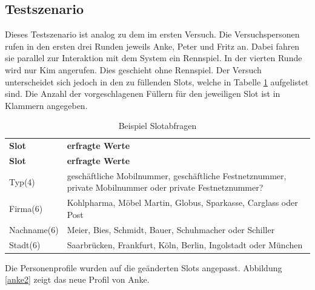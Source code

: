 \documentclass[12pt,a4paper]{scrartcl}
\begin{document}
\subsection{Testszenario}
Dieses Testszenario ist analog zu dem im ersten Versuch. Die Versuchspersonen rufen in den ersten drei Runden jeweils Anke, Peter und Fritz an. Dabei fahren sie parallel zur Interaktion mit dem System ein Rennspiel. In der vierten Runde wird nur Kim angerufen. Dies geschieht ohne Rennspiel. Der Versuch unterscheidet sich jedoch in den zu füllenden Slots, welche in Tabelle \ref{slots2} aufgelistet sind. Die Anzahl der vorgeschlagenen Füllern für den jeweiligen Slot ist in Klammern angegeben.
\newpage


\begin{longtable}{p{4cm}p{10cm}}
	\label{slots2}\\
	\caption[Slotabfragen]{Beispiel Slotabfragen}\\
	\hline
	\textbf{Slot} &\textbf{erfragte Werte}\\
	\hline
	\endfirsthead
	\hline
	\textbf{Slot} &	\textbf{erfragte Werte}\\
	\hline
	\endhead
Typ(4) & geschäftliche Mobilnummer, geschäftliche Festnetznummer, private Mobilnummer oder private Festnetznummer?\\
Firma(6) & Kohlpharma, Möbel Martin, Globus, Sparkasse, Carglass oder Post\\
Nachname(6) & Meier, Bies, Schmidt, Bauer, Schuhmacher oder Schiller \\
Stadt(6) & Saarbrücken, Frankfurt, Köln, Berlin, Ingolstadt oder München\\
\hline
\end{longtable}
\newpage

Die Personenprofile wurden auf die geänderten Slots angepasst. Abbildung \ref{anke2} zeigt das neue Profil von Anke. 
\end{document}
